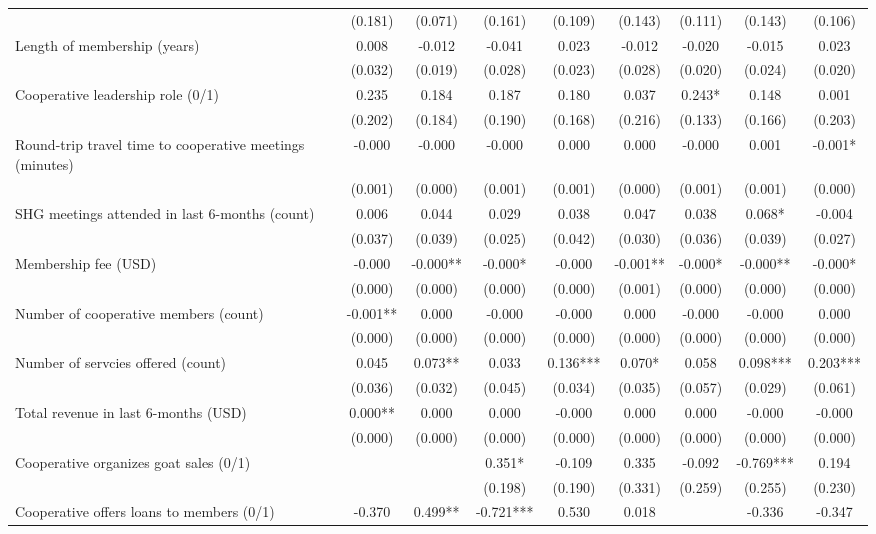 \documentclass[11pt]{article}
\begin{document}
\begin{landscape}
\begin{table}[H]
{\begin{tabularx}{1.8\linewidth}{lcccccccc}
 & (0.181) & (0.071) & (0.161) & (0.109) & (0.143) & (0.111) & (0.143) & (0.106) \\
Length of membership (years) & 0.008 & -0.012 & -0.041 & 0.023 & -0.012 & -0.020 & -0.015 & 0.023 \\
 & (0.032) & (0.019) & (0.028) & (0.023) & (0.028) & (0.020) & (0.024) & (0.020) \\
Cooperative leadership role (0/1) & 0.235 & 0.184 & 0.187 & 0.180 & 0.037 & 0.243* & 0.148 & 0.001 \\
 & (0.202) & (0.184) & (0.190) & (0.168) & (0.216) & (0.133) & (0.166) & (0.203) \\
Round-trip travel time to cooperative meetings (minutes) & -0.000 & -0.000 & -0.000 & 0.000 & 0.000 & -0.000 & 0.001 & -0.001* \\
 & (0.001) & (0.000) & (0.001) & (0.001) & (0.000) & (0.001) & (0.001) & (0.000) \\
SHG meetings attended in last 6-months (count) & 0.006 & 0.044 & 0.029 & 0.038 & 0.047 & 0.038 & 0.068* & -0.004 \\
 & (0.037) & (0.039) & (0.025) & (0.042) & (0.030) & (0.036) & (0.039) & (0.027) \\
Membership fee (USD) & -0.000 & -0.000** & -0.000* & -0.000 & -0.001** & -0.000* & -0.000** & -0.000* \\
 & (0.000) & (0.000) & (0.000) & (0.000) & (0.001) & (0.000) & (0.000) & (0.000) \\
Number of cooperative members (count) & -0.001** & 0.000 & -0.000 & -0.000 & 0.000 & -0.000 & -0.000 & 0.000 \\
 & (0.000) & (0.000) & (0.000) & (0.000) & (0.000) & (0.000) & (0.000) & (0.000) \\
Number of servcies offered (count) & 0.045 & 0.073** & 0.033 & 0.136*** & 0.070* & 0.058 & 0.098*** & 0.203*** \\
 & (0.036) & (0.032) & (0.045) & (0.034) & (0.035) & (0.057) & (0.029) & (0.061) \\
Total revenue in last 6-months (USD) & 0.000** & 0.000 & 0.000 & -0.000 & 0.000 & 0.000 & -0.000 & -0.000 \\
 & (0.000) & (0.000) & (0.000) & (0.000) & (0.000) & (0.000) & (0.000) & (0.000) \\
 Cooperative organizes goat sales (0/1) &  &  & 0.351* & -0.109 & 0.335 & -0.092 & -0.769*** & 0.194 \\
 &  &  & (0.198) & (0.190) & (0.331) & (0.259) & (0.255) & (0.230) \\
Cooperative offers loans to members (0/1) & -0.370 & 0.499** & -0.721*** & 0.530 & 0.018 &  & -0.336 & -0.347 \\

\end{tabularx}}
\end{table}
\end{landscape}
\end{document}
